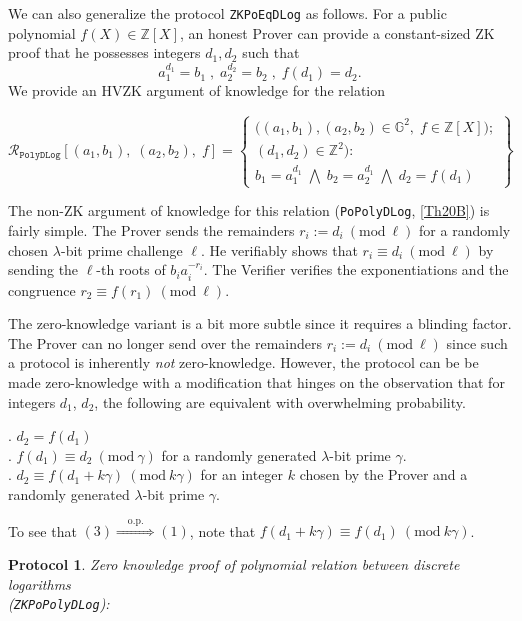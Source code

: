 \documentclass[11pt, lettersize, notitlepage, leqno, footskip=0.6cm]{article}
\newcommand{\bz}{\mathbb Z}
\newcommand{\ttt}{\texttt}
\newcommand{\impop}{\overset{\;\;\;\;\mr{o.p.}\;\;\;\;}{\Longrightarrow}}
\newcommand{\mc}{\mathcal}
\newcommand{\mb}{\mathbb}
\newcommand{\mr}{\mathrm}
\newcommand{\lam}{\lambda}
\newcommand{\vs}{\vspace{-0.15cm}}
\newcommand{\noin}{\noindent}
\newcommand{\op}{overwhelming probability}
\newcommand{\Mod}[1]{\ (\mathrm{mod}\ #1)}
\newtheorem{Prot}[Thm]{Protocol}
\numberwithin{equation}{section}
\begin{document}
\noin We can also generalize the protocol \verb|ZKPoEqDLog| as follows. For a public polynomial {$f(X)\in \bz[X]$}, an honest Prover can provide a constant-sized ZK proof that he possesses integers $d_1,d_2$ such that \vs $$a_1^{d_1} = b_1\;,\;a_2^{d_2} = b_2\;,\;f(d_1) = d_2. $$ We provide an HVZK argument of knowledge for the relation \vs

\[
  \mc{R}_{{\ttt{PolyDLog}}}[(a_1, b_1),\;(a_2,b_2),\;f] = \left\{\begin{array}{l}
    \big((a_1, b_1), (a_2,b_2)\in\mb{G}^2,\;f\in\bz[X]\big);\\
    (d_1, d_2)\in\mb{Z}^2): \\
    b_1 = a_1^{d_1}\; \bigwedge\; b_2 = a_2^{d_1}\; \bigwedge \;d_2 = f(d_1)
  \end{array}\right\}
\] 

\vspace{0.1cm}

The non-ZK argument of knowledge for this relation (\verb|PoPolyDLog|, \hyperlink{Th20}{[Th20B]}) is fairly simple. The Prover sends the remainders $r_i:= d_i\Mod{\ell}$ for a randomly chosen $\lam$-bit prime challenge $\ell$. He verifiably shows that $r_i\equiv d_i\Mod{\ell}$ by sending the $\ell$-th roots of $b_ia_i^{-r_i}$. The Verifier verifies the exponentiations and the congruence $r_2\equiv f(r_1)\Mod{\ell}$.

The zero-knowledge variant is a bit more subtle since it requires a blinding factor. The Prover can no longer send over the remainders $r_i:= d_i\Mod{\ell}$ since such a protocol is inherently \textit{not} zero-knowledge. However, the protocol can be be made zero-knowledge with a modification that hinges on the observation that for integers $d_1$, $d_2$, the following are equivalent with \op.\vspace{0.1cm}

\noin 1. $d_2 = f(d_1)$\\
\noin 2. $f(d_1)\equiv d_2\Mod{\gamma}$ for a randomly generated $\lam$-bit prime $\gamma$.\\
\noin 3. $d_2 \equiv f(d_1+k\gamma)\Mod{k\gamma} $ for an integer $k$ chosen by the Prover and a randomly generated $\lam$-bit prime $\gamma$. 

To see that $(3)\impop (1)$, note that $f(d_1+k\gamma)\equiv f(d_1)\Mod{k\gamma}$.\vspace{0.1cm}



\begin{Prot} \normalfont \hypertarget{Poly}{\textit{Zero knowledge proof of polynomial relation between discrete logarithms}}\\ (\verb|ZKPoPolyDLog|):\end{Prot} \vspace{-0.3cm}
\end{document}
